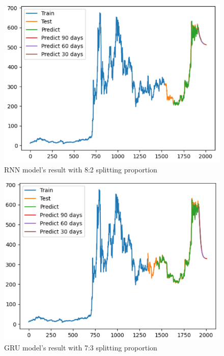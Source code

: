\documentclass{ieeeojies}
\begin{document}
\begin{figure}[H]
	\centering
	\begin{minipage}{0.6\linewidth}
		\centering
		\includegraphics[width=\linewidth]{bibliography/Images/RNN_BNB_82.PNG}
		\caption{RNN model's result with 8:2 splitting proportion}
	\end{minipage}
\end{figure}
\begin{figure}[H]
	\centering
	\begin{minipage}{0.6\linewidth}
		\centering
		\includegraphics[width=\linewidth]{bibliography/Images/GRU_BNB_73.PNG}
		\caption{GRU model's result with 7:3 splitting proportion}
	\end{minipage}
\end{figure}
\end{document}
